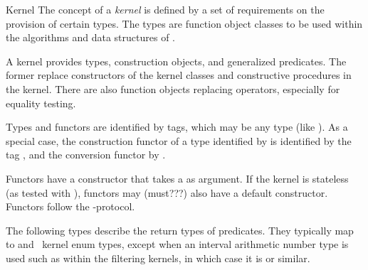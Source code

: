 \begin{ccRefConcept}{Kernel}
The concept of a {\em kernel} is defined by a set of requirements on
the provision of certain types.  The types are function object classes to be
used within the algorithms and data structures of \cgal.

A kernel provides types, construction objects, and generalized predicates.
The former replace constructors of the kernel classes and constructive
procedures in the kernel. There are also function objects replacing operators,
especially for equality testing.

Types and functors are identified by tags, which may be any type (like ). As a special case, the construction functor of a type identified by  is identified by the tag , and the conversion functor by .

Functors have a constructor that takes a  as argument. If the kernel is stateless (as tested with ), functors may (must???) also have a default constructor. Functors follow the -protocol.

\ccTypes

\ccGlue
{}

The following types describe the return types of predicates.  They typically
map to  and \cgal\ kernel enum types, except when an interval arithmetic
number type is used such as within the filtering kernels, in which case it is
 or similar.

\ccGlue
{}
\ccGlue
{}
\ccGlue
{}
\ccGlue
{}
\ccGlue
{}
\ccGlue
{}





\end{ccRefConcept}

